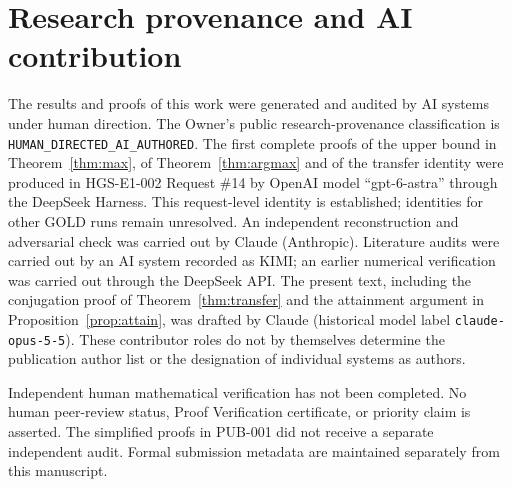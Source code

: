 \documentclass[11pt]{amsart}
\theoremstyle{definition}
\theoremstyle{remark}
\numberwithin{equation}{section}
\begin{document}
\section*{Research provenance and AI contribution}
The results and proofs of this work were generated and audited by AI systems under human direction. The Owner's
public research-provenance classification is
\texttt{HUMAN\_DIRECTED\_AI\_AUTHORED}. The first complete proofs of the upper bound in
Theorem~\ref{thm:max}, of Theorem~\ref{thm:argmax} and of the transfer identity were
produced in HGS-E1-002 Request \#14 by OpenAI model ``gpt-6-astra'' through the DeepSeek
Harness. This request-level identity is established; identities for other GOLD runs remain
unresolved. An independent reconstruction and adversarial check was carried out by Claude (Anthropic).
Literature audits were carried out by an AI system recorded as KIMI; an earlier numerical
verification was carried out through the DeepSeek API. The present text, including the
conjugation proof of Theorem~\ref{thm:transfer} and the attainment argument in
Proposition~\ref{prop:attain}, was drafted by Claude (historical model label
\texttt{claude-opus-5-5}). These contributor roles do not by themselves determine the
publication author list or the designation of individual systems as authors.

Independent human mathematical verification has not been completed. No human peer-review
status, Proof Verification certificate, or priority claim is asserted. The simplified proofs
in PUB-001 did not receive a separate independent audit. Formal submission metadata are maintained separately from this manuscript.



\end{document}
